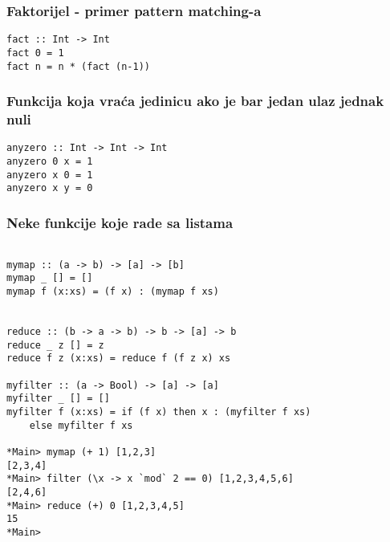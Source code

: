 \documentclass{beamer}
\begin{document}
\begin{frame}[fragile]
\frametitle{Faktorijel - primer pattern matching-a} 
\begin{lstlisting}
fact :: Int -> Int
fact 0 = 1
fact n = n * (fact (n-1))
\end{lstlisting}
\end{frame}

\begin{frame}
\frametitle{Funkcija koja vraća jedinicu ako je bar jedan ulaz jednak nuli}
\begin{lstlisting}
anyzero :: Int -> Int -> Int
anyzero 0 x = 1
anyzero x 0 = 1
anyzero x y = 0
\end{lstlisting}
\end{frame}


\begin{frame}[fragile]
\frametitle{Neke funkcije koje rade sa listama}
\begin{lstlisting}

mymap :: (a -> b) -> [a] -> [b]
mymap _ [] = []
mymap f (x:xs) = (f x) : (mymap f xs)


reduce :: (b -> a -> b) -> b -> [a] -> b 
reduce _ z [] = z 
reduce f z (x:xs) = reduce f (f z x) xs

myfilter :: (a -> Bool) -> [a] -> [a]
myfilter _ [] = [] 
myfilter f (x:xs) = if (f x) then x : (myfilter f xs) 
	else myfilter f xs

*Main> mymap (+ 1) [1,2,3]
[2,3,4]
*Main> filter (\x -> x `mod` 2 == 0) [1,2,3,4,5,6]
[2,4,6]
*Main> reduce (+) 0 [1,2,3,4,5]
15
*Main> 

\end{lstlisting}
\end{frame}
\end{document}
